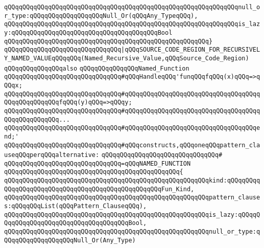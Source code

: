 \verb|qQQqqQQqqQQqqQQqqQQqqQQqqQQqqQQqqQQqqQQqqQQqqQQqqQQqqQQqqQQqqQQqnull_or_type:qQQqqQQqqQQqqQQqqQQqNull_Or(qQQqAny_TypeqQQq),|\newline
\verb|qQQqqQQqqQQqqQQqqQQqqQQqqQQqqQQqqQQqqQQqqQQqqQQqqQQqqQQqqQQqqQQqis_lazy:qQQqqQQqqQQqqQQqqQQqqQQqqQQqqQQqqQQqqQQqBool|\newline
\verb|qQQqqQQqqQQqqQQqqQQqqQQqqQQqqQQqqQQqqQQqqQQqqQQqqQQqqQQq}|\newline
\newline
\verb|qQQqqQQqqQQqqQQqqQQqqQQqqQQqqQQq|\verb#|qQQqSOURCE_CODE_REGION_FOR_RECURSIVELY_NAMED_VALUEqQQqqQQq(Named_Recursive_Value,qQQqSource_Code_Region)#\newline
\newline
\newline
\newline
\verb|qQQqqQQqqQQqqQQqalso|\newline
\verb|qQQqqQQqqQQqqQQqNamed_Function|\newline
\newline
\verb|qQQqqQQqqQQqqQQqqQQqqQQqqQQqqQQq#qQQqHandleqQQq'funqQQqfqQQq(x)qQQq=>qQQqx;|\newline
\verb|qQQqqQQqqQQqqQQqqQQqqQQqqQQqqQQq#qQQqqQQqqQQqqQQqqQQqqQQqqQQqqQQqqQQqqQQqqQQqqQQqqQQqfqQQq(y)qQQq=>qQQqy;|\newline
\verb|qQQqqQQqqQQqqQQqqQQqqQQqqQQqqQQq#qQQqqQQqqQQqqQQqqQQqqQQqqQQqqQQqqQQqqQQqqQQqqQQqqQQq...|\newline
\verb|qQQqqQQqqQQqqQQqqQQqqQQqqQQqqQQq#qQQqqQQqqQQqqQQqqQQqqQQqqQQqqQQqqQQqend;'|\newline
\verb|qQQqqQQqqQQqqQQqqQQqqQQqqQQqqQQq#qQQqconstructs,qQQqoneqQQqpattern_clauseqQQqperqQQqalternative:|\newline
\verb|qQQqqQQqqQQqqQQqqQQqqQQqqQQqqQQq#|\newline
\verb|qQQqqQQqqQQqqQQqqQQqqQQqqQQqqQQq=qQQqNAMED_FUNCTION|\newline
\verb|qQQqqQQqqQQqqQQqqQQqqQQqqQQqqQQqqQQqqQQqqQQqqQQq{|\newline
\verb|qQQqqQQqqQQqqQQqqQQqqQQqqQQqqQQqqQQqqQQqqQQqqQQqqQQqqQQqkind:qQQqqQQqqQQqqQQqqQQqqQQqqQQqqQQqqQQqqQQqqQQqqQQqqQQqFun_Kind,|\newline
\verb|qQQqqQQqqQQqqQQqqQQqqQQqqQQqqQQqqQQqqQQqqQQqqQQqqQQqqQQqpattern_clauses:qQQqqQQqList(qQQqPattern_ClauseqQQq),|\newline
\verb|qQQqqQQqqQQqqQQqqQQqqQQqqQQqqQQqqQQqqQQqqQQqqQQqqQQqqQQqis_lazy:qQQqqQQqqQQqqQQqqQQqqQQqqQQqqQQqqQQqqQQqBool,|\newline
\verb|qQQqqQQqqQQqqQQqqQQqqQQqqQQqqQQqqQQqqQQqqQQqqQQqqQQqqQQqnull_or_type:qQQqqQQqqQQqqQQqqQQqNull_Or(Any_Type)|\newline
